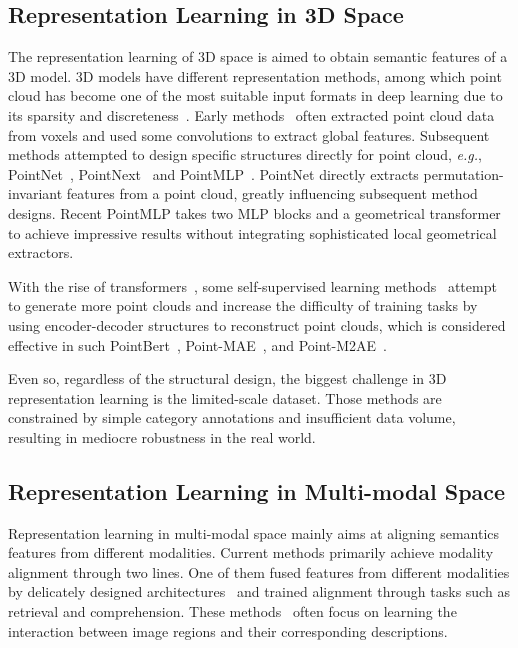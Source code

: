 \documentclass[sigconf]{acmart}
\begin{document}
\subsection{Representation Learning in 3D Space}
The representation learning of 3D space is aimed to obtain semantic features of a 3D model. 3D models have different representation methods, among which point cloud has become one of the most suitable input formats in deep learning due to its sparsity and discreteness~\cite{aubry2011wave, bronstein2010scale, sun2009concise, wu20153d, maturana2015voxnet, zhao-etal-2023-generating-visual}. Early methods~\cite{maturana2015voxnet, shi2020pv} often extracted point cloud data from voxels and used some convolutions to extract global features. Subsequent methods attempted to design specific structures directly for point cloud, \emph{e.g.}, PointNet~\cite{qi2017pointnet}, PointNext~\cite{qian2022pointnext} and PointMLP~\cite{marethinking}. PointNet directly extracts permutation-invariant features from a point cloud, greatly influencing subsequent method designs. Recent PointMLP takes two MLP blocks and a geometrical transformer to achieve impressive results without integrating sophisticated local geometrical extractors.

With the rise of transformers~\cite{vaswani2017attention}, some self-supervised learning methods~\cite{guo2021pct, liu2022masked, xiao2023unsupervised} attempt to generate more point clouds and increase the difficulty of training tasks by using encoder-decoder structures to reconstruct point clouds, which is considered effective in such PointBert~\cite{yu2022point}, Point-MAE~\cite{pang2022masked}, and Point-M2AE~\cite{zhangpoint}. 

Even so, regardless of the structural design, the biggest challenge in 3D representation learning is the limited-scale dataset. Those methods are constrained by simple category annotations and insufficient data volume, resulting in mediocre robustness in the real world.

\subsection{Representation Learning in Multi-modal Space}
Representation learning in multi-modal space mainly aims at aligning semantics features from different modalities. Current methods primarily achieve modality alignment through two lines. One of them fused features from different modalities by delicately designed architectures~\cite{li2019visualbert, li2020oscar, chen2020uniter, hu2023you, fei-etal-2023-scene} and trained alignment through tasks such as retrieval and comprehension. These methods~\cite{li2019visualbert, li2020oscar, lu2019vilbert, tan2019lxmert, wang2023towards, jin2023refclip} often focus on learning the interaction between image regions and their corresponding descriptions.
\end{document}
